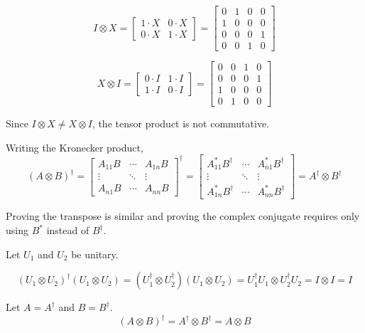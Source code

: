 $$I \otimes X = \begin{bmatrix}
1 \cdot X & 0 \cdot X \\
0 \cdot X & 1 \cdot X
\end{bmatrix} = \begin{bmatrix}
0 & 1 & 0 & 0 \\
1 & 0 & 0 & 0 \\
0 & 0 & 0 & 1 \\
0 & 0 & 1 & 0
\end{bmatrix}$$

$$X \otimes I = \begin{bmatrix}
0 \cdot I & 1 \cdot I \\
1 \cdot I & 0 \cdot I 
\end{bmatrix} = \begin{bmatrix}
0 & 0 & 1 & 0 \\
0 & 0 & 0 & 1 \\
1 & 0 & 0 & 0 \\
0 & 1 & 0 & 0
\end{bmatrix}$$

Since $I \otimes X \neq X \otimes I$, the tensor product is not commutative. 

\exercise
Writing the Kronecker product, 
$$(A \otimes B)^{\dagger} = \begin{bmatrix}
A_{11} B & \cdots & A_{1n} B \\
\vdots & \ddots & \vdots \\
A_{n1} B & \cdots & A_{nn} B
\end{bmatrix}^{\dagger} = \begin{bmatrix}
A_{11}^{*} B^{\dagger} & \cdots & A_{n1}^{*} B^{\dagger} \\
\vdots & \ddots & \vdots \\
A_{1n}^{*} B^{\dagger} & \cdots & A_{nn}^{*} B^{\dagger}
\end{bmatrix} = A^{\dagger} \otimes B^{\dagger}$$

Proving the transpose is similar and proving the complex conjugate requires only using $B^{*}$ instead of $B^{\dagger}$. 

\exercise
Let $U_{1}$ and $U_{2}$ be unitary. 

$$(U_{1} \otimes U_{2})^{\dagger} (U_{1} \otimes U_{2}) = (U_{1}^{\dagger} \otimes U_{2}^{\dagger})(U_{1} \otimes U_{2}) = U_{1}^{\dagger} U_{1} \otimes U_{2}^{\dagger} U_{2} = I \otimes I = I$$

\exercise
Let $A = A^{\dagger}$ and $B = B^{\dagger}$. 
$$(A \otimes B)^{\dagger} = A^{\dagger} \otimes B^{\dagger} = A \otimes B$$

